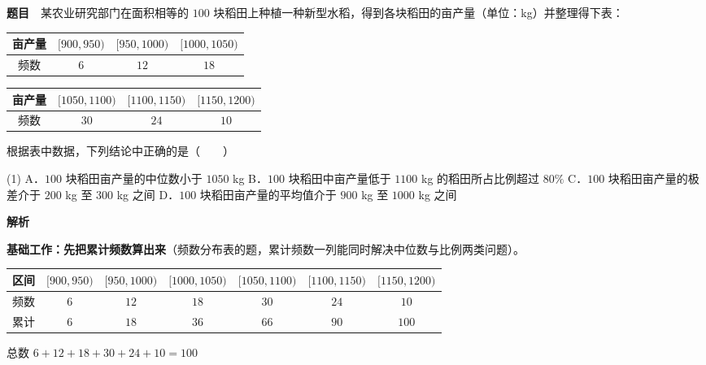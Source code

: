\par\medskip


\textbf{题目}　某农业研究部门在面积相等的 $100$ 块稻田上种植一种新型水稻，得到各块稻田的亩产量（单位：kg）并整理得下表：

\begin{center}
\begin{tabular}{cccc}
\toprule
亩产量 & $[900,950)$ & $[950,1000)$ & $[1000,1050)$ \\
\midrule
频数 & $6$ & $12$ & $18$ \\
\bottomrule
\end{tabular}
\end{center}

\begin{center}
\begin{tabular}{cccc}
\toprule
亩产量 & $[1050,1100)$ & $[1100,1150)$ & $[1150,1200)$ \\
\midrule
频数 & $30$ & $24$ & $10$ \\
\bottomrule
\end{tabular}
\end{center}

  根据表中数据，下列结论中正确的是（　　）

\begin{gkopts}(1)
\task A．$100$ 块稻田亩产量的中位数小于 $1050$ kg
\task B．$100$ 块稻田中亩产量低于 $1100$ kg 的稻田所占比例超过 $80\%$
\task C．$100$ 块稻田亩产量的极差介于 $200$ kg 至 $300$ kg 之间
\task D．$100$ 块稻田亩产量的平均值介于 $900$ kg 至 $1000$ kg 之间
\end{gkopts}

\textbf{解析}

\textbf{基础工作：先把累计频数算出来}（频数分布表的题，累计频数一列能同时解决中位数与比例两类问题）。

\begin{center}
\begin{tabular}{lcccccc}
\toprule
区间 & $[900,950)$ & $[950,1000)$ & $[1000,1050)$ & $[1050,1100)$ & $[1100,1150)$ & $[1150,1200)$ \\
\midrule
频数 & $6$ & $12$ & $18$ & $30$ & $24$ & $10$ \\
累计 & $6$ & $18$ & $36$ & $66$ & $90$ & $100$ \\
\bottomrule
\end{tabular}
\end{center}

总数 $6+12+18+30+24+10=100$ 

